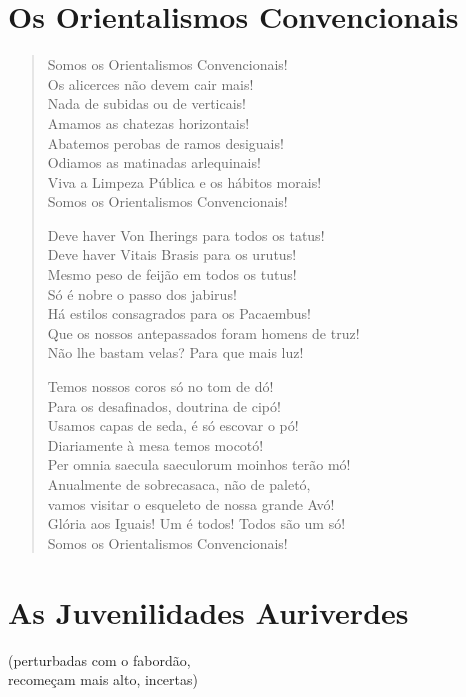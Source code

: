 \section*{Os Orientalismos Convencionais}

\begin{verse}
Somos os Orientalismos Convencionais!\\
Os alicerces não devem cair mais!\\
Nada de subidas ou de verticais!\\
Amamos as chatezas horizontais!\\
Abatemos perobas de ramos desiguais!\\
Odiamos as matinadas arlequinais!\\
Viva a Limpeza Pública e os hábitos morais!\\
Somos os Orientalismos Convencionais!

Deve haver Von Iherings para todos os tatus!\\
Deve haver Vitais Brasis para os urutus!\\
Mesmo peso de feijão em todos os tutus!\\
Só é nobre o passo dos jabirus!\\
Há estilos consagrados para os Pacaembus!\\
Que os nossos antepassados foram homens de truz!\\
Não lhe bastam velas? Para que mais luz!

Temos nossos coros só no tom de dó!\\
Para os desafinados, doutrina de cipó!\\
Usamos capas de seda, é só escovar o pó!\\
Diariamente à mesa temos mocotó!\\
Per omnia saecula saeculorum moinhos terão mó!\\
Anualmente de sobrecasaca, não de paletó,\\
vamos visitar o esqueleto de nossa grande Avó!\\
Glória aos Iguais! Um é todos! Todos são um só!\\
Somos os Orientalismos Convencionais!
\end{verse}

\section*{As Juvenilidades Auriverdes}

\begin{flushright}
(perturbadas com o fabordão,\\
recomeçam mais alto, incertas)
\end{flushright}

